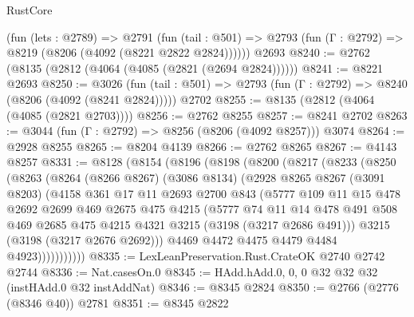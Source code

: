 \begin{lexlean}{RustCore}
\begin{coremodule}
    (fun (lets : @2789) =>
    @2791
      (fun (tail : @501) => @2793 (fun (Γ : @2792) => @8219 (@8206 (@4092 (@8221 @2822 @2824))))))
    @2693
@8240 := @2762 (@8135 (@2812 (@4064 (@4085 (@2821 (@2694 @2824))))))
@8241 := @8221 @2693
@8250 := @3026
    (fun (tail : @501) => @2793 (fun (Γ : @2792) => @8240 (@8206 (@4092 (@8241 @2824)))))
    @2702
@8255 := @8135 (@2812 (@4064 (@4085 (@2821 @2703))))
@8256 := @2762 @8255
@8257 := @8241 @2702
@8263 := @3044 (fun (Γ : @2792) => @8256 (@8206 (@4092 @8257))) @3074
@8264 := @2928 @8255
@8265 := @8204 @4139
@8266 := @2762 @8265
@8267 := @4143 @8257
@8331 := @8128
    (@8154
      (@8196
        (@8198
          (@8200
            (@8217
              (@8233
                (@8250
                  (@8263
                    (@8264
                      (@8266 @8267)
                      (@3086 @8134)
                      (@2928
                        @8265
                        @8267
                        (@3091 @8203)
                        (@4158
                          @361
                          @17
                          @11
                          @2693
                          @2700
                          @843
                          (@5777
                            @109
                            @11
                            @15
                            @478
                            @2692
                            @2699
                            @469
                            @2675
                            @475
                            @4215
                            (@5777
                              @74
                              @11
                              @14
                              @478
                              @491
                              @508
                              @469
                              @2685
                              @475
                              @4215
                              @4321
                              @3215
                              (@3198 (@3217 @2686 @491)))
                            @3215
                            (@3198 (@3217 @2676 @2692)))
                          @4469
                          @4472
                          @4475
                          @4479
                          @4484
                          @4923)))))))))))
@8335 := LexLeanPreservation.Rust.CrateOK @2740 @2742 @2744
@8336 := Nat.casesOn.{0}
@8345 := HAdd.hAdd.{0, 0, 0} @32 @32 @32 (instHAdd.{0} @32 instAddNat)
@8346 := @8345 @2824
@8350 := @2766 (@2776 (@8346 @40)) @2781
@8351 := @8345 @2822

\end{coremodule}
\end{lexlean}

